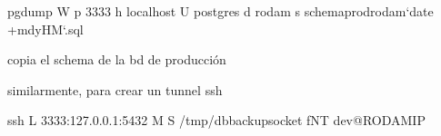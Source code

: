 \documentclass[letterpaper,10pt,spanish]{sphinxmanual}
\begin{document}
\begin{sphinxVerbatim}[commandchars=\\\{\}]
pg\PYGZus{}dump \PYGZhy{}W \PYGZhy{}p 3333 \PYGZhy{}h localhost \PYGZhy{}U postgres   \PYGZhy{}d rodam \PYGZhy{}s \PYGZgt{} schema\PYGZus{}prod\PYGZus{}rodam\PYGZus{}`date +\PYGZpc{}m\PYGZpc{}d\PYGZpc{}y\PYGZus{}\PYGZpc{}H\PYGZpc{}M`.sql

copia el schema de la bd de producción
\end{sphinxVerbatim}

similarmente, para crear un tunnel ssh

\begin{sphinxVerbatim}[commandchars=\\\{\}]
ssh \PYGZhy{}L 3333:127.0.0.1:5432 \PYGZhy{}M \PYGZhy{}S /tmp/db\PYGZhy{}backup\PYGZhy{}socket \PYGZhy{}fNT dev@\PYGZdl{}RODAM\PYGZus{}IP
\end{sphinxVerbatim}



\renewcommand{\indexname}{Índice}
\printindex
\end{document}
